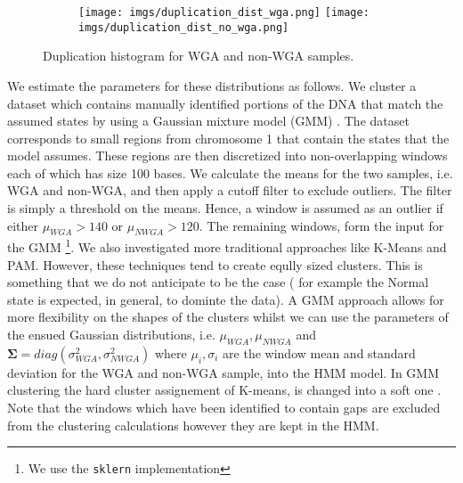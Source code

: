 \begin{figure}[h]
	\begin{subfigure}{}
		\texttt{[image: imgs/duplication\_dist\_wga.png]}
		\texttt{[image: imgs/duplication\_dist\_no\_wga.png]}	
	\end{subfigure}
	
	\caption{Duplication histogram for WGA and non-WGA samples.  }
	\label{fig:image3}
\end{figure}
We estimate the parameters for these distributions as follows. We cluster a dataset which contains manually identified portions of the DNA that match the assumed states by using a Gaussian mixture model (GMM) \cite{flach2012}. The dataset corresponds to small regions from chromosome 1 that contain the states that the model assumes. These regions are then discretized into non-overlapping windows each of which has size 100 bases.  We calculate the means for the two samples, i.e. WGA and non-WGA, and then apply a cutoff filter to exclude outliers. The filter is simply a threshold on the means. Hence, a window is assumed as an outlier if either $\mu_{WGA} > 140$ or $\mu_{NWGA} > 120$.  The remaining windows, form the input for the GMM \footnote{We use the \texttt{sklern} implementation}.  We also investigated more traditional approaches like K-Means and PAM. However, these techniques tend to create eqully sized clusters. This is something  that we do not anticipate to be the case ( for example the Normal state is expected, in general, to dominte the data). A GMM approach allows for more flexibility on the shapes of the clusters whilst we can use the parameters of the ensued Gaussian distributions, i.e. $\mu_{WGA}, \mu_{NWGA}$ and   $\boldsymbol{\Sigma} = diag(\sigma_{WGA}^2, \sigma_{NWGA}^2)$ where $\mu_{i}, \sigma_{i}$ are the window mean and standard  deviation for the WGA and non-WGA sample,  into the HMM model. In GMM clustering the hard cluster assignement of K-means, is changed into a soft one \cite{flach2012}. Note that the windows which have been identified to contain gaps are excluded from the clustering calculations however they are kept in the HMM.  



